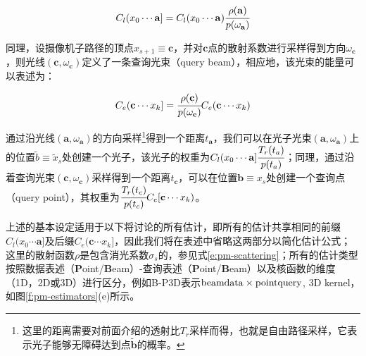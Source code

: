 \begin{equation}
	C_l(x_0\cdots\mathbf{a}]=C_l(x_0\cdots\mathbf{a}) \cfrac{\rho(\mathbf{a})}{p(\omega_{\mathbf{a}})}
\end{equation}

同理，设摄像机子路径的顶点$x_{s+1}\equiv\mathbf{c}$，并对$\mathbf{c}$点的散射系数进行采样得到方向$\omega_{\mathbf{c}}$，则光线$(\mathbf{c},\omega_{\mathbf{c}})$定义了一条查询光束（query beam），相应地，该光束的能量可以表述为：

\begin{equation}
	C_e(\mathbf{c}\cdots x_k]= \cfrac{\rho(\mathbf{c})}{p(\omega_{\mathbf{c}})}C_e(\mathbf{c}\cdots x_k)
\end{equation}

通过沿光线$(\mathbf{a},\omega_{\mathbf{a}})$的方向采样\footnote{这里的距离需要对前面介绍的透射比$T_r$采样而得，也就是自由路径采样，它表示光子能够无障碍达到点$\tilde{\mathbf{b}}$的概率。}得到一个距离$t_{\mathbf{a}}$，我们可以在光子光束$(\mathbf{a},\omega_{\mathbf{a}})$上的位置$\tilde{b}\equiv\tilde{x}_s$处创建一个光子，该光子的权重为$C_l(x_0\cdots\mathbf{a}] \cfrac{T_r(t_a)}{p(t_a)}$；同理，通过沿着查询光束$(\mathbf{c},\omega_{\mathbf{c}})$采样得到一个距离$t_{\mathbf{c}}$，可以在位置$\mathbf{b}\equiv x_s$处创建一个查询点（query point），其权重为$ \cfrac{T_r(t_c)}{p(t_c)}C_e[\mathbf{c}\cdots x_k)$。

上述的基本设定适用于以下将讨论的所有估计，即所有的估计共享相同的前缀$C_l(x_0\cdots\mathbf{a}]$及后缀$C_e(\mathbf{c}\cdots x_k]$，因此我们将在表述中省略这两部分以简化估计公式；这里的散射函数$\rho$是包含消光系数$\sigma_s$的，参见式\ref{e:pm-scattering}；所有的估计类型按照数据表述（\textbf{P}oint/\textbf{B}eam）-查询表述（\textbf{P}oint/\textbf{B}eam）以及核函数的维度（1D，2D或3D）进行区分，例如B-P3D表示${\rm beam data}\times {\rm point query}$, 3D kernel，如图\ref{f:pm-estimators}(e)所示。
	
